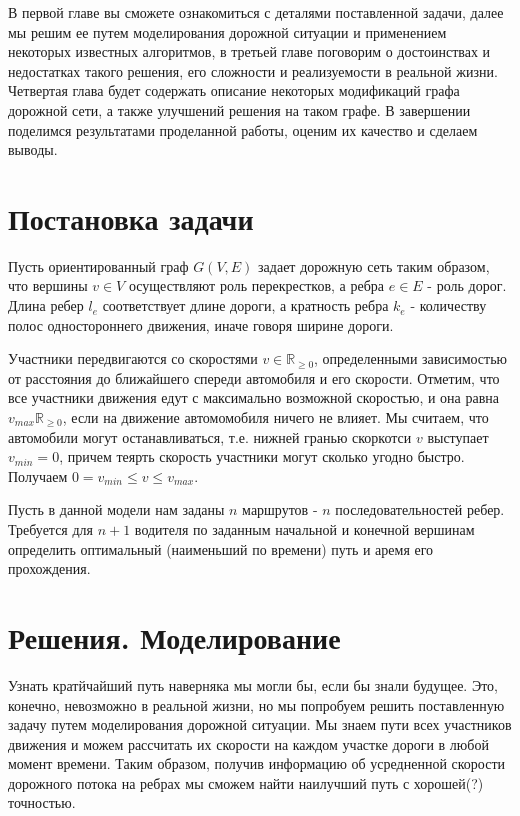 \documentclass[12pt, a4paper]{article}
\begin{document}
В первой главе вы сможете ознакомиться с деталями поставленной задачи, далее мы решим ее путем моделирования дорожной ситуации и применением некоторых известных алгоритмов, в третьей главе поговорим о достоинствах и недостатках такого решения, его сложности и реализуемости в реальной жизни. Четвертая глава будет содержать описание некоторых модификаций графа дорожной сети, а также улучшений решения на таком графе. В завершении поделимся результатами проделанной работы, оценим их качество и сделаем выводы.


\newpage
\section*{Постановка задачи}

Пусть ориентированный граф $ G (V, E)$ задает дорожную сеть таким образом, что вершины $ v \in V$ осуществляют роль перекрестков, а ребра $e \in E$ - роль дорог. Длина ребер $l_e$ соответствует длине дороги, а кратность ребра $ k_e $ - количеству полос одностороннего движения, иначе говоря ширине дороги. 

Участники передвигаются со скоростями $v \in \mathbb {R}_{\geq 0}$, определенными зависимостью от расстояния до ближайшего спереди автомобиля и его скорости. Отметим, что все участники движения едут с максимально возможной скоростью, и она равна $ v_{max} \mathbb {R}_{\geq 0}$, если на движение автомомобиля ничего не влияет. Мы считаем, что автомобили могут останавливаться, т.е. нижней гранью скоркотси $ v $ выступает $v_{min} = 0$, причем теярть скорость участники могут сколько угодно быстро. Получаем $ 0 = v_{min} \leq v \leq v_{max} $.

Пусть в данной модели нам заданы $ n $ маршрутов - $ n $ последовательностей ребер. Требуется для $ n+1 $ водителя по заданным начальной и конечной вершинам определить оптимальный (наименьший по времени) путь и аремя его прохождения.

\newpage
\section*{Решения. Моделирование}

Узнать кратйчайший путь наверняка мы могли бы, если бы знали будущее. Это, конечно, невозможно в реальной жизни, но мы попробуем решить поставленную задачу путем моделирования дорожной ситуации. Мы знаем пути всех участников движения и можем рассчитать их скорости на каждом участке дороги в любой момент времени. Таким образом, получив информацию об усредненной скорости дорожного потока на ребрах мы сможем найти наилучший путь с хорошей(?) точностью.
\end{document}
